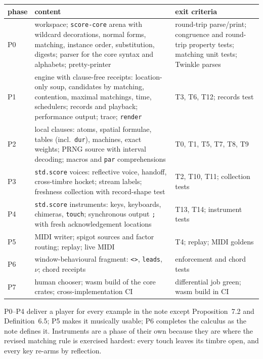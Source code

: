 \documentclass[11pt,a4paper]{article}
\theoremstyle{definition}
\theoremstyle{remark}
\begin{document}
\begin{center}
\small
\begin{tabular}{@{}l>{\raggedright\arraybackslash}p{5.6cm}>{\raggedright\arraybackslash}p{5.0cm}@{}}
\toprule
phase & content & exit criteria \\
\midrule
P0 & workspace; \texttt{score-core} arena with wildcard decorations, normal
  forms, matching, instance order, substitution, digests; parser for the core
  syntax and alphabets; pretty-printer &
  round-trip parse/print; congruence and round-trip property tests; matching
  unit tests; Twinkle parses \\
P1 & engine with clause-free receipts: location-only soup, candidates by
  matching, contention, maximal matchings, time, schedulers; records and
  playback; performance output; trace; \texttt{render} &
  T3, T6, T12; records test \\
P2 & local clauses: atoms, spatial formulae, tables (incl.\ \texttt{dur}),
  machines, exact weights; PRNG source with interval decoding; macros and
  \texttt{par} comprehensions &
  T0, T1, T5, T7, T8, T9 \\
P3 & \texttt{std.score} voices: reflective voice, handoff, cross-timbre
  hocket; stream labels; freshness collection with record-shape test &
  T2, T10, T11; collection tests \\
P4 & \texttt{std.score} instruments: keys, keyboards, chimeras, \texttt{touch};
  synchronous output \texttt{;} with fresh acknowledgement locations &
  T13, T14; instrument tests \\
P5 & MIDI writer; spigot sources and factor routing; replay; live MIDI &
  T4; replay; MIDI goldens \\
P6 & window-behavioural fragment: \texttt{<>}, \texttt{leads}, $\nu$; chord
  receipts & enforcement and chord tests \\
P7 & human chooser; wasm build of the core crates; cross-implementation CI &
  differential job green; wasm build in CI \\
\bottomrule
\end{tabular}
\end{center}

\noindent P0--P4 deliver a player for every example in the note except
Proposition~7.2 and Definition~6.5; P5 makes it musically usable; P6 completes
the calculus as the note defines it. Instruments are a phase of their own
because they are where the revised matching rule is exercised hardest: every
touch leaves its timbre open, and every key re-arms by reflection.
\end{document}
